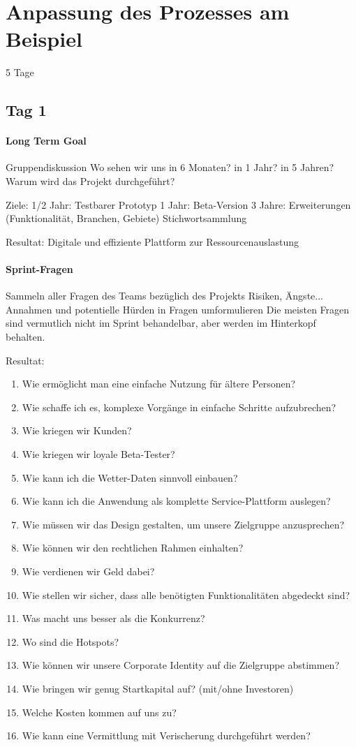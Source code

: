 \section{Anpassung des Prozesses am Beispiel}
5 Tage

\subsection*{Tag 1}
\paragraph{Long Term Goal}
Gruppendiskussion
Wo sehen wir uns in 6 Monaten? in 1 Jahr? in 5 Jahren?
Warum wird das Projekt durchgeführt?

Ziele:
1/2 Jahr: Testbarer Prototyp
1 Jahr: Beta-Version
3 Jahre: Erweiterungen (Funktionalität, Branchen, Gebiete)
Stichwortsammlung

Resultat: Digitale und effiziente Plattform zur Ressourcenauslastung
\paragraph{Sprint-Fragen}
Sammeln aller Fragen des Teams bezüglich des Projekts
Risiken, Ängste...
Annahmen und potentielle Hürden in Fragen umformulieren
Die meisten Fragen sind vermutlich nicht im Sprint behandelbar, aber werden im Hinterkopf behalten.

Resultat: 

\begin{enumerate}
	\item Wie ermöglicht man eine einfache Nutzung für ältere Personen?
	\item Wie schaffe ich es, komplexe Vorgänge in einfache Schritte aufzubrechen?
	\item Wie kriegen wir Kunden?
	\item Wie kriegen wir loyale Beta-Tester?
	\item Wie kann ich die Wetter-Daten sinnvoll einbauen?
	\item Wie kann ich die Anwendung als komplette Service-Plattform auslegen?
	\item Wie müssen wir das Design gestalten, um unsere Zielgruppe anzusprechen?
	\item Wie können wir den rechtlichen Rahmen einhalten?
	\item Wie verdienen wir Geld dabei?
	\item Wie stellen wir sicher, dass alle benötigten Funktionalitäten abgedeckt sind?
	\item Was macht uns besser als die Konkurrenz?
	\item Wo sind die Hotspots?
	\item Wie können wir unsere Corporate Identity auf die Zielgruppe abstimmen?
	\item Wie bringen wir genug Startkapital auf? (mit/ohne Investoren)
	\item Welche Kosten kommen auf uns zu?
	\item Wie kann eine Vermittlung mit Verischerung durchgeführt werden?
\end{enumerate}
